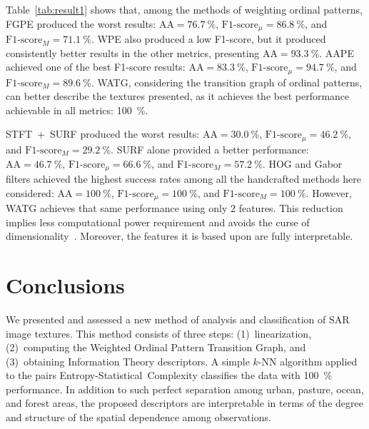 \documentclass[journal]{IEEEtran}
\begin{document}
Table~\ref{tab:result1} shows that, among the methods of weighting ordinal patterns, FGPE produced the worst results: $\text{AA} = \SI{76.7}{\percent}$, $\text{F1-score}_\mu = \SI{86.8}{\percent}$, and $\text{F1-score}_M = \SI{71.1}{\percent}$.
%
WPE also produced a low F1-score, but it produced consistently better results in the other metrics, presenting $\text{AA} = \SI{93.3}{\percent}$.
%
AAPE achieved one of the best F1-score results: $\text{AA} = \SI{83.3}{\percent}$, $\text{F1-score}_\mu = \SI{94.7}{\percent}$, and $\text{F1-score}_M = \SI{89.6}{\percent}$.
%
WATG, considering the transition graph of ordinal patterns, can better describe the textures presented, as it achieves the best performance achievable in all metrics: \SI{100}{\percent}.

\mbox{STFT + SURF} produced the worst results: $\text{AA} = \SI{30.0}{\percent}$, $\text{F1-score}_\mu = \SI{46.2}{\percent}$, and $\text{F1-score}_M = \SI{29.2}{\percent}$.
%
SURF alone provided a better performance: $\text{AA} = \SI{46.7}{\percent}$,  $\text{F1-score}_\mu = \SI{66.6}{\percent}$, and $\text{F1-score}_M = \SI{57.2}{\percent}$.
%
HOG and Gabor filters achieved the highest success rates
among all the handcrafted methods here considered: $\text{AA} = \SI{100}{\percent}$, $\text{F1-score}_\mu = \SI{100}{\percent}$, and $\text{F1-score}_M = \SI{100}{\percent}$.
However, WATG achieves that same performance using only $2$ features.
This reduction implies less computational power requirement and avoids the curse of dimensionality~\cite{TheCursesofDimensionality2018}.
Moreover, the features it is based upon are fully interpretable.

\section{Conclusions}\label{Conclusion}

We presented and assessed a new method of analysis and classification of SAR image textures.
This method consists of three steps: 
(1)~linearization, 
(2)~computing the Weighted Ordinal Pattern Transition Graph, and 
(3)~obtaining Information Theory descriptors.
A simple $k$-NN algorithm applied to the pairs Entropy-Statistical~Complexity classifies the data with \SI{100}{\percent} performance.
In addition to such perfect separation among urban, pasture, ocean, and forest areas, the proposed descriptors are interpretable in terms of the degree and structure of the spatial dependence among observations.
\end{document}
